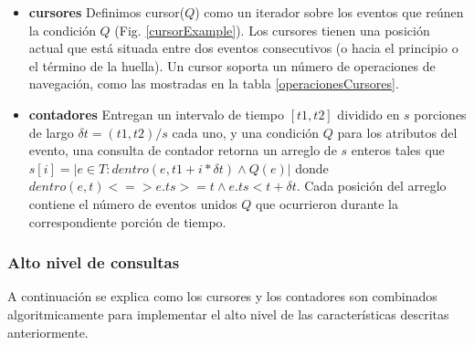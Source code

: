 \documentclass[12pt,legalpaper]{report}
\begin{document}
\begin{itemize}
	\item \textbf{cursores} Definimos cursor($Q$) como un iterador sobre los eventos que reúnen la condición $Q$ (Fig. \ref{cursorExample}).  Los cursores tienen una posición actual que está situada entre dos eventos consecutivos (o hacia el principio o el término de la huella).  Un cursor soporta un número de operaciones de navegación, como las mostradas en la tabla \ref{operacionesCursores}.

	\item \textbf{contadores} Entregan un intervalo de tiempo $[t1,t2]$ dividido en $s$ porciones de largo $\delta t = (t1,t2)/s$ cada uno, y una condición $Q$ para los atributos del evento, una consulta de contador retorna un arreglo de $s$ enteros tales que $s[i] = | {e \in T: dentro(e, t1 + i*\delta t) \wedge Q(e)} |$ donde $dentro(e,t) < = > e.ts > = t  \wedge e.ts < t + \delta t$.   Cada posición del arreglo contiene el número de eventos unidos $Q$ que ocurrieron durante la correspondiente porción de tiempo.
\end{itemize}

			\subsubsection{Alto nivel de consultas}

A continuación se explica como los cursores y los contadores son combinados algoritmicamente para implementar el alto nivel de las características descritas anteriormente.
\end{document}
